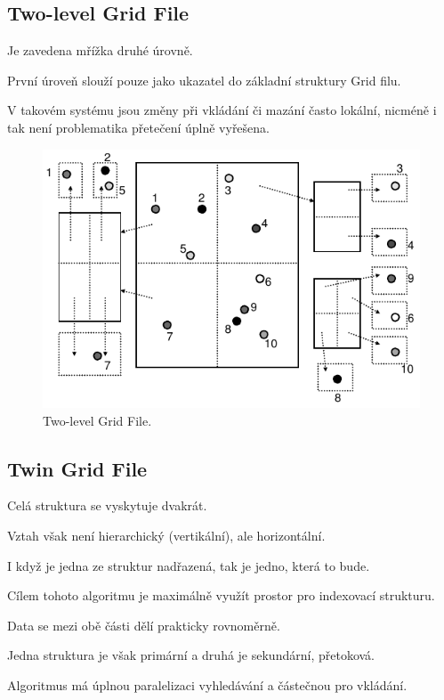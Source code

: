 \subsection{Two-level Grid File}

\begin{compactitem}
    \item Je zavedena mřížka druhé úrovně. \begin{compactitem}
        \item První úroveň slouží pouze jako ukazatel do základní struktury Grid filu.
    \end{compactitem}

    \item V takovém systému jsou změny při vkládání či mazání často lokální, nicméně i tak není problematika přetečení úplně vyřešena.
\end{compactitem}

\begin{figure}[H]
    \centering
    \includegraphics[width=0.75\linewidth]{grid_file_two_level.pdf}
    \caption{Two-level Grid File.}
\end{figure}

\subsection{Twin Grid File}

\begin{compactitem}
    \item Celá struktura se vyskytuje dvakrát. \begin{compactitem}
        \item Vztah však není hierarchický (vertikální), ale horizontální.
        \item I když je jedna ze struktur nadřazená, tak je jedno, která to bude.
    \end{compactitem}
    \item Cílem tohoto algoritmu je maximálně využít prostor pro indexovací strukturu. \begin{compactitem}
        \item Data se mezi obě části dělí prakticky rovnoměrně.
        \item Jedna struktura je však primární a druhá je sekundární, přetoková.
    \end{compactitem}
    \item Algoritmus má úplnou paralelizaci vyhledávání a částečnou pro vkládání.
\end{compactitem}

